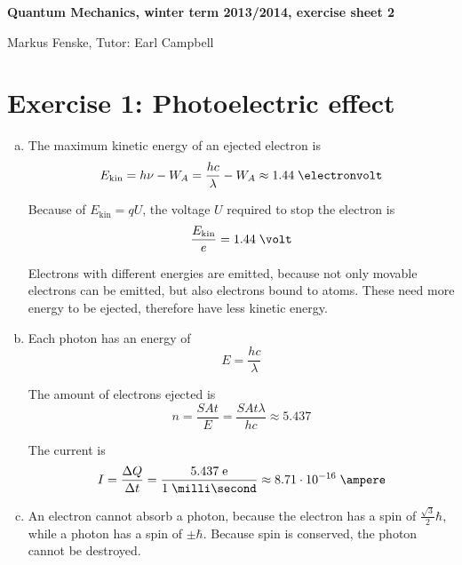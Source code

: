 \documentclass[a4paper,german,12pt,smallheadings]{scrartcl}
\begin{document}
\begin{center}
\bfseries %
\sffamily %
\vspace{-40pt}
Quantum Mechanics, winter term 2013/2014, exercise sheet 2

Markus Fenske, Tutor: Earl Campbell
\vspace{-10pt}
\end{center}

\section*{Exercise 1: Photoelectric effect}

\begin{enumerate}[a)]
  \item
    The maximum kinetic energy of an ejected electron is
    \begin{equation*}
      E_\text{kin} = h \nu - W_A = \frac{hc}{\lambda} - W_A \approx 1.44 \; \electronvolt
    \end{equation*}

    Because of $E_\text{kin} = q U$, the voltage $U$ required to stop the electron is
    \begin{equation*}
      \frac{E_\text{kin}}{e} = 1.44 \; \volt
    \end{equation*}

    Electrons with different energies are emitted, because not only movable
    electrons can be emitted, but also electrons bound to atoms. These need
    more energy to be ejected, therefore have less kinetic energy.

  \item
    Each photon has an energy of
    \begin{equation*}
      E = \frac{hc}{\lambda}
    \end{equation*}

    The amount of electrons ejected is
    \begin{equation*}
      n = \frac{S A t}{E} = \frac{S A t \lambda}{hc} \approx 5.437
    \end{equation*}

    The current is
    \begin{equation*}
      I = \frac{\Delta Q}{\Delta t} = \frac{5.437 \; \text{e}}{1 \; \milli\second} \approx 8.71 \cdot 10^{-16} \; \ampere
    \end{equation*}

  \item
    An electron cannot absorb a photon, because the electron has a spin of $
    \frac{\sqrt{3}}{2} \hbar$, while a photon has a spin of $\pm \hbar$. Because spin
    is conserved, the photon cannot be destroyed.


\end{enumerate}
\end{document}
